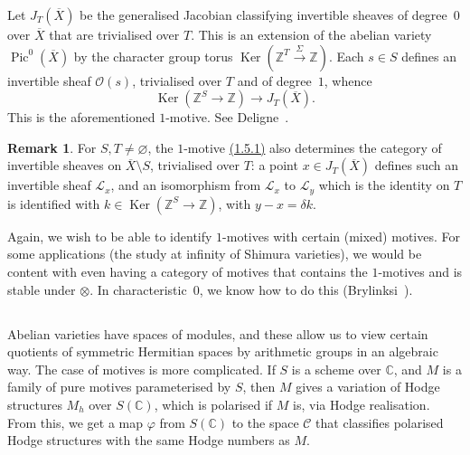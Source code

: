 \documentclass{article}
\theoremstyle{plain}
\theoremstyle{definition}
\newtheorem*{remark}{Remark}
\newcommand{\scr}[1]{{\mathscr{#1}}}
\newcommand{\ZZ}{\mathbb{Z}}
\newcommand{\CC}{\mathbb{C}}
\DeclareMathOperator{\Pic}{Pic}
\DeclareMathOperator{\Ker}{Ker}
\begin{document}
Let $J_T(\overline{X})$ be the generalised Jacobian classifying invertible sheaves of degree~$0$ over $\overline{X}$ that are trivialised over $T$.
This is an extension of the abelian variety $\Pic^0(\overline{X})$ by the character group torus $\Ker(\ZZ^T\xrightarrow{\Sigma}\ZZ)$.
Each $s\in S$ defines an invertible sheaf $\scr{O}(s)$, trivialised over $T$ and of degree~$1$, whence
\[
\label{1.5.1}
  \Ker(\ZZ^S\to\ZZ) \to J_T(\overline{X}).
\tag{1.5.1}
\]
This is the aforementioned $1$-motive.
See Deligne~\cite[\S10]{9}.

\begin{remark}
  For $S,T\neq\varnothing$, the $1$-motive \hyperref[1.5.1]{(1.5.1)} also determines the category of invertible sheaves on $\overline{X}\setminus S$, trivialised over $T$: a point $x\in J_T(\overline{X})$ defines such an invertible sheaf $\scr{L}_x$, and an isomorphism from $\scr{L}_x$ to $\scr{L}_y$ which is the identity on $T$ is identified with $k\in\Ker(\ZZ^S\to\ZZ)$, with $y-x=\delta k$.
\end{remark}

Again, we wish to be able to identify $1$-motives with certain (mixed) motives.
For some applications (the study at infinity of Shimura varieties), we would be content with even having a category of motives that contains the $1$-motives and is stable under $\otimes$.
In characteristic~$0$, we know how to do this (Brylinksi~\cite{7}).


\subsection{}
\label{1.6}

Abelian varieties have spaces of modules, and these allow us to view certain quotients of symmetric Hermitian spaces by arithmetic groups in an algebraic way.
The case of motives is more complicated.
If $S$ is a scheme over $\CC$, and $M$ is a family of pure motives parameterised by $S$, then $M$ gives a variation of Hodge structures $M_h$ over $S(\CC)$, which is polarised if $M$ is, via Hodge realisation.
From this, we get a map $\varphi$ from $S(\CC)$ to the space $\mathscr{C}$ that classifies polarised Hodge structures with the same Hodge numbers as $M$.
\end{document}
